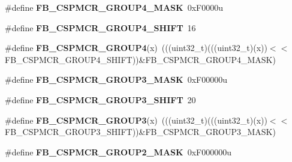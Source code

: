 \begin{DoxyCompactItemize}
\item 
\#define {\bfseries F\+B\+\_\+\+C\+S\+P\+M\+C\+R\+\_\+\+G\+R\+O\+U\+P4\+\_\+\+M\+A\+SK}~0x\+F0000u\hypertarget{group__FB__Register__Masks_gaa24d34ff345a0131f93f71c38e20b7a5}{}\label{group__FB__Register__Masks_gaa24d34ff345a0131f93f71c38e20b7a5}

\item 
\#define {\bfseries F\+B\+\_\+\+C\+S\+P\+M\+C\+R\+\_\+\+G\+R\+O\+U\+P4\+\_\+\+S\+H\+I\+FT}~16\hypertarget{group__FB__Register__Masks_ga53fde1abc71ae9149418ea7fb6e53fba}{}\label{group__FB__Register__Masks_ga53fde1abc71ae9149418ea7fb6e53fba}

\item 
\#define {\bfseries F\+B\+\_\+\+C\+S\+P\+M\+C\+R\+\_\+\+G\+R\+O\+U\+P4}(x)~(((uint32\+\_\+t)(((uint32\+\_\+t)(x))$<$$<$F\+B\+\_\+\+C\+S\+P\+M\+C\+R\+\_\+\+G\+R\+O\+U\+P4\+\_\+\+S\+H\+I\+FT))\&F\+B\+\_\+\+C\+S\+P\+M\+C\+R\+\_\+\+G\+R\+O\+U\+P4\+\_\+\+M\+A\+SK)\hypertarget{group__FB__Register__Masks_ga5bc5cb1164507be89f7cf0324491d5f1}{}\label{group__FB__Register__Masks_ga5bc5cb1164507be89f7cf0324491d5f1}

\item 
\#define {\bfseries F\+B\+\_\+\+C\+S\+P\+M\+C\+R\+\_\+\+G\+R\+O\+U\+P3\+\_\+\+M\+A\+SK}~0x\+F00000u\hypertarget{group__FB__Register__Masks_gac53d0fcbc3464725ceda1d20147fe98c}{}\label{group__FB__Register__Masks_gac53d0fcbc3464725ceda1d20147fe98c}

\item 
\#define {\bfseries F\+B\+\_\+\+C\+S\+P\+M\+C\+R\+\_\+\+G\+R\+O\+U\+P3\+\_\+\+S\+H\+I\+FT}~20\hypertarget{group__FB__Register__Masks_ga9f0b849b6cb1a2f629dcd23a0a0a4306}{}\label{group__FB__Register__Masks_ga9f0b849b6cb1a2f629dcd23a0a0a4306}

\item 
\#define {\bfseries F\+B\+\_\+\+C\+S\+P\+M\+C\+R\+\_\+\+G\+R\+O\+U\+P3}(x)~(((uint32\+\_\+t)(((uint32\+\_\+t)(x))$<$$<$F\+B\+\_\+\+C\+S\+P\+M\+C\+R\+\_\+\+G\+R\+O\+U\+P3\+\_\+\+S\+H\+I\+FT))\&F\+B\+\_\+\+C\+S\+P\+M\+C\+R\+\_\+\+G\+R\+O\+U\+P3\+\_\+\+M\+A\+SK)\hypertarget{group__FB__Register__Masks_ga5f46c89a4298c3b2b367d829487dcb4b}{}\label{group__FB__Register__Masks_ga5f46c89a4298c3b2b367d829487dcb4b}

\item 
\#define {\bfseries F\+B\+\_\+\+C\+S\+P\+M\+C\+R\+\_\+\+G\+R\+O\+U\+P2\+\_\+\+M\+A\+SK}~0x\+F000000u\hypertarget{group__FB__Register__Masks_ga594596b281baba23e03cb37fbf0a05db}{}\label{group__FB__Register__Masks_ga594596b281baba23e03cb37fbf0a05db}


\end{DoxyCompactItemize}

